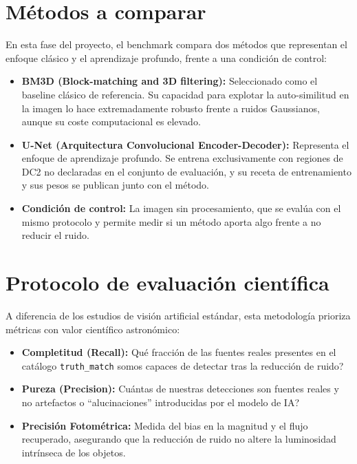 \section{M\'etodos a comparar}

En esta fase del proyecto, el benchmark compara dos m\'etodos que representan el enfoque cl\'asico y el aprendizaje profundo, frente a una condici\'on de control:

\begin{itemize}
  \item \textbf{BM3D (Block-matching and 3D filtering):} Seleccionado como el baseline cl\'asico de referencia. Su capacidad para explotar la auto-similitud en la imagen lo hace extremadamente robusto frente a ruidos Gaussianos, aunque su coste computacional es elevado.
  \item \textbf{U-Net (Arquitectura Convolucional Encoder-Decoder):} Representa el enfoque de aprendizaje profundo. Se entrena exclusivamente con regiones de DC2 no declaradas en el conjunto de evaluaci\'on, y su receta de entrenamiento y sus pesos se publican junto con el m\'etodo.
  \item \textbf{Condici\'on de control:} La imagen sin procesamiento, que se eval\'ua con el mismo protocolo y permite medir si un m\'etodo aporta algo frente a no reducir el ruido.
\end{itemize}

\section{Protocolo de evaluaci\'on cient\'ifica}

A diferencia de los estudios de visi\'on artificial est\'andar, esta metodolog\'ia prioriza m\'etricas con valor cient\'ifico astron\'omico:

\begin{itemize}
  \item \textbf{Completitud (Recall):} \textquestiondown Qu\'e fracci\'on de las fuentes reales presentes en el catálogo \texttt{truth\_match} somos capaces de detectar tras la reducci\'on de ruido?
  \item \textbf{Pureza (Precision):} \textquestiondown Cu\'antas de nuestras detecciones son fuentes reales y no artefactos o ``alucinaciones'' introducidas por el modelo de IA?
  \item \textbf{Precisi\'on Fotom\'etrica:} Medida del bias en la magnitud y el flujo recuperado, asegurando que la reducci\'on de ruido no altere la luminosidad intr\'inseca de los objetos.
\end{itemize}

